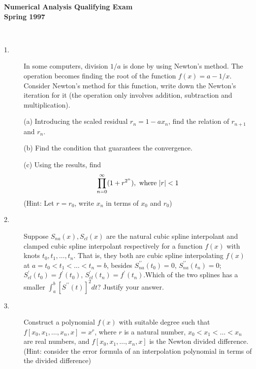 \documentclass{article}
\begin{document}






\begin{center}\begin{LARGE}
{\bf Numerical Analysis Qualifying Exam}\\ 
{\bf Spring 1997}\\ \end{LARGE}
\end{center}
\vspace{0.1in}
\noindent\hrulefill\\

\begin{description}

\item[1.]
In some computers, division $1/a$ is done by using Newton's method. The
operation becomes finding the root of the function $f(x) = a - 1/x$.
Consider Newton's method for this function, write down the Newton's
iteration for it (the operation only involves addition, subtraction and
multiplication).

\item[\quad] (a)
Introducing the scaled residual $r_n = 1 - ax_n$, find the relation of
$r_{n+1}$ and $r_n$.

\item[\quad] (b)
Find the condition that guarantees the convergence.

\item[\quad] (c)
Using the results, find
$$\prod^\infty_{n=0} (1+ r^{2^n}), \hbox{\ where\ } |r| <1$$
(Hint: Let $r = r_0$, write $x_n$ in terms of $x_0$ and $r_0$)

\item[2.]
Suppose $S_{na} (x), S_{cl} (x)$ are the natural cubic spline interpolant and
clamped cubic spline interpolant respectively for a function $f(x)$
with knots $t_0, t_1, \dots, t_n$. That is, they both are cubic spline
interpolating $f(x)$ at $a = t_0 < t_1 < \dots <t_n = b$, besides
$S_{na}^{\prime \prime} (t_0) = 0$, 
$S_{na}^{\prime \prime} (t_n) = 0$; $S_{cl}^\prime (t_0) = f^\prime (t_0)$,
$S_{cl}^\prime (t_n) = f^\prime (t_n)$.Which of the two splines has a smaller
$\int^b_a [S^{\prime \prime} (t)]^2 dt$? Justify your answer.

\item[3.]
Construct a polynomial $f(x)$ with suitable degree such that
$f[x_0, x_1, \dots, x_n, x]= x^r$, where $r$ is a natural number,
$x_0< x_1< \dots < x_n$ are real numbers, and $f[x_0, x_1, \dots, x_n, x]$
is the Newton divided difference. (Hint: consider the error formula of an
interpolation polynomial in terms of the divided difference)


\end{description}
\end{document}
